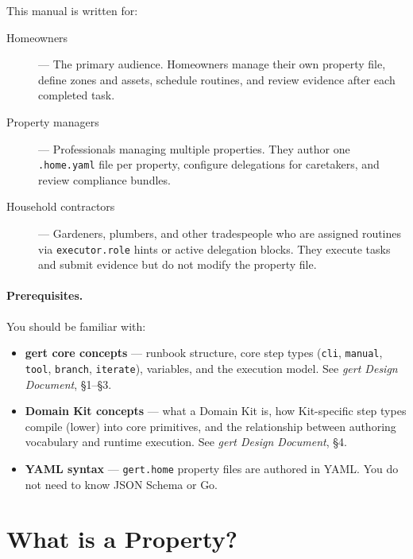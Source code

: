 This manual is written for:

\begin{description}
  \item[Homeowners] --- The primary audience. Homeowners manage their own property file,
        define zones and assets, schedule routines, and review evidence after each completed
        task.
  \item[Property managers] --- Professionals managing multiple properties. They author one
        \texttt{.home.yaml} file per property, configure delegations for caretakers, and
        review compliance bundles.
  \item[Household contractors] --- Gardeners, plumbers, and other tradespeople who are
        assigned routines via \texttt{executor.role} hints or active delegation blocks. They
        execute tasks and submit evidence but do not modify the property file.
\end{description}

\paragraph{Prerequisites.}
You should be familiar with:

\begin{itemize}
  \item \textbf{gert core concepts} --- runbook structure, core step types (\texttt{cli},
        \texttt{manual}, \texttt{tool}, \texttt{branch}, \texttt{iterate}), variables, and the
        execution model. See \emph{gert Design Document}, §1--§3.
  \item \textbf{Domain Kit concepts} --- what a Domain Kit is, how Kit-specific step types
        compile (lower) into core primitives, and the relationship between authoring vocabulary
        and runtime execution. See \emph{gert Design Document}, §4.
  \item \textbf{YAML syntax} --- \texttt{gert.home} property files are authored in YAML. You
        do not need to know JSON Schema or Go.
\end{itemize}

\section{What is a Property?}
\label{sec:intro-concept}

